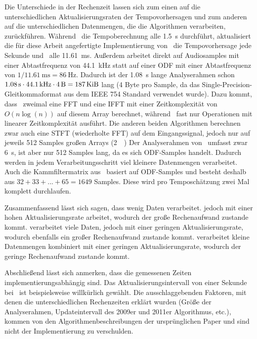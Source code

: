 {{		%
		Die Unterschiede in der Rechenzeit lassen sich zum einen auf die unterschiedlichen Aktualisierungsraten der Tempovorhersagen
			und zum anderen auf die unterschiedlichen Datenmengen,
			die die Algorithmen verarbeiten,
			zurückführen.
		Während~\cite{2009_DaPlSt} die Tempoberechnung alle \SI{1.5}{\second} durchführt,
			aktualisiert die für diese Arbeit angefertigte Implementierung von~\cite{2001_BeatThis} die Tempovorhersage jede Sekunde
			und~\cite{2011_PlRoSt} alle \SI{11.61}{\milli\second}.
		Au{\ss}erdem arbeitet \cite{2001_BeatThis} direkt auf Audiosamples
			mit einer Abtastfrequenz von \SI{44.1}{\kilo\hertz}
			statt auf einer \ac{ODF} mit einer Abtastfrequenz von $1 / \SI{11.61}{\milli\second} = \SI{86}{\hertz}$.
		Dadurch ist der \SI{1.08}{\second} lange Analyserahmen schon $\SI{1.08}{\second} \cdot \SI{44.1}{\kilo\hertz} \cdot \SI{4}{\byte} = \SI{187}{\kibi\byte}$ lang (\num{4} Byte pro Sample, da das Single-Precision-Gleitkommaformat aus dem \acs{IEEE} 754 Standard verwendet wurde).
		Dazu kommt,
			dass~\cite{2001_BeatThis} zweimal eine \ac{FFT} und eine \ac{IFFT} mit einer Zeitkomplexität von $O(n\log(n))$ auf diesem Array berechnet,
			während~\cite{2009_DaPlSt} fast nur Operationen mit linearer Zeitkomplexität ausführt.
		Die anderen beiden Algorithmen berechnen zwar auch eine \ac{STFT} (wiederholte \ac{FFT}) auf dem Eingangssignal,
			jedoch nur auf jeweils \num{512} Samples gro{\ss}en Arrays (\SI{2}{\kibi\byte})
		Der Analyserahmen von~\cite{2009_DaPlSt} umfasst zwar \SI{6}{\second},
			ist aber nur \num{512} Samples lang,
			da es sich \ac{ODF}-Samples handelt.
		Dadurch werden in jedem Verarbeitungsschritt viel kleinere Datenmengen verarbeitet.
		Auch die Kammfiltermatrix aus~\cite{2011_PlRoSt} basiert auf \ac{ODF}-Samples
			und besteht deshalb aus $32 + 33 + ... + 65 = 1649$ Samples.
		Diese wird pro Temposchätzung zwei Mal komplett durchlaufen.

		Zusammenfassend lässt sich sagen,
			dass \cite{2011_PlRoSt} wenig Daten verarbeitet.
			jedoch mit einer hohen Aktualisierungsrate arbeitet,
			wodurch der gro{\ss}e Rechenaufwand zustande kommt.
		\cite{2001_BeatThis} verarbeitet viele Daten,
			jedoch mit einer geringen Aktualisierungsrate,
			wodurch ebenfalls ein gro{\ss}er Rechenaufwand zustande kommt.
		\cite{2009_DaPlSt} verarbeitet kleine Datenmengen kombiniert mit einer geringen Aktualisierungsrate,
			wodurch der geringe Rechenaufwand zustande kommt.

		Abschlie{\ss}end lässt sich anmerken,
			dass die gemessenen Zeiten implementierungsabhängig sind.
		Das Aktualisierungsintervall von einer Sekunde bei~\cite{2001_BeatThis} ist beispielsweise willkürlich gewählt.
		Die ausschlaggebenden Faktoren,
			mit denen die unterschiedlichen Rechenzeiten erklärt wurden
			(Grö{\ss}e der Analyserahmen, Updateintervall des 2009er und 2011er Algorithmus, etc.),
			kommen von den Algorithmenbeschreibungen der ursprünglichen Paper
			und sind nicht der Implementierung zu verschulden.
	}
}
